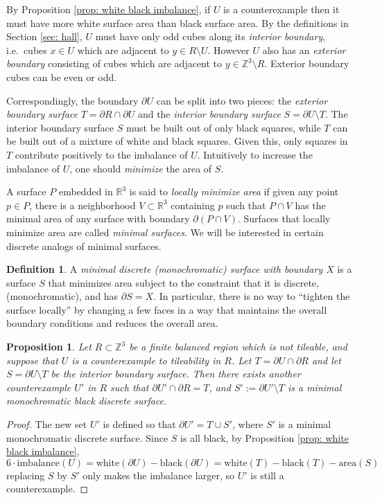 \documentclass[11pt]{article}
\newtheorem{prop}[thm]{Proposition}
\theoremstyle{remark}
\theoremstyle{definition}
\newtheorem{definition}[thm]{Definition}
\newcommand{\m}[1]{\mathbb{#1}}
\newcommand{\termindex}[1]{\index{{\textbf{Terms}}!#1}}
\begin{document}
By Proposition \ref{prop: white black imbalance}, if $U$ is a counterexample then it must have more white surface area than black surface area. By the definitions in Section \ref{sec: hall}, $U$ must have only odd cubes along its \textit{interior boundary}, i.e.\ cubes $x\in U$ which are adjacent to $y\in R\setminus U$. However $U$ also has an \textit{exterior boundary} consisting of cubes which are adjacent to $y\in \m Z^3\setminus R$. Exterior boundary cubes can be even or odd. 

Correspondingly, the boundary $\partial U$ can be split into two pieces: the \textit{exterior boundary surface} $T = \partial R\cap \partial U$ and the \textit{interior boundary surface} $S = \partial U\setminus T$. The interior boundary surface $S$ must be built out of only black squares, while $T$ can be built out of a mixture of white and black squares. Given this, only squares in $T$ contribute positively to the imbalance of $U$. Intuitively to increase the imbalance of $U$, one should \textit{minimize} the area of $S$. 

A surface $P$ embedded in $\m R^3$ is said to \textit{locally minimize area} if given any point $p\in P$, there is a neighborhood $V\subset \m R^3$ containing $p$ such that $P\cap V$ has the minimal area of any surface with boundary $\partial (P\cap V)$. Surfaces that locally minimize area are called \textit{minimal surfaces}. We will be interested in certain discrete analogs of minimal surfaces.

\begin{definition}
A \textit{minimal discrete (monochromatic) surface with boundary $X$} is a surface $S$ that minimizes area subject to the constraint that it is discrete, (monochromatic), and has $\partial S = X$. In particular, there is no way to ``tighten the surface locally'' by changing a few faces in a way that maintains the overall boundary conditions and reduces the overall area.\termindex{Chapter 6!minimal (monochromatic) surface}
\end{definition}


\begin{prop}\label{prop:minimalsurface}
Let $R\subset \mathbb{Z}^3$ be a finite balanced region which is not tileable, and suppose that $U$ is a counterexample to tileability in $R$. Let $T = \partial U \cap \partial R$ and let $S = \partial U\setminus T$ be the interior boundary surface. Then there exists another counterexample $U'$ in $R$ such that $\partial U' \cap \partial R = T$, and $S':= \partial U' \setminus T$ is a minimal monochromatic black discrete surface.
\end{prop}
\begin{proof}
	The new set $U'$ is defined so that $\partial U' = T \cup S'$, where $S'$ is a minimal monochromatic discrete surface. Since $S$ is all black, by Proposition \ref{prop: white black imbalance},
	\begin{equation}\label{eq:imbalance_area_2}
		6\cdot \text{imbalance}(U) =  \text{white}(\partial U) - \text{black}(\partial U) = \text{white}(T) - \text{black}(T) - \text{area}(S)
	\end{equation}
	replacing $S$ by $S'$ only makes the imbalance larger, so $U'$ is still a counterexample.
\end{proof}
\end{document}
